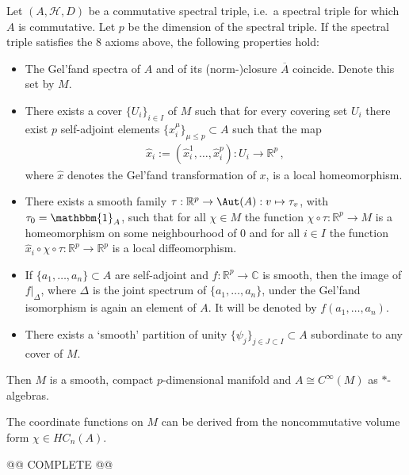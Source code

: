     \begin{construct}
        Let $(A,\mathcal{H},D)$ be a commutative spectral triple, i.e.~a spectral triple for which $A$ is commutative. Let $p$ be the dimension of the spectral triple. If the spectral triple satisfies the 8 axioms above, the following properties hold:
        \begin{itemize}
            \item The Gel'fand spectra of $A$ and of its (norm-)closure $\overline{A}$ coincide. Denote this set by $M$.
            \item There exists a cover $\{U_i\}_{i\in I}$ of $M$ such that for every covering set $U_i$ there exist $p$ self-adjoint elements $\{x^\mu_i\}_{\mu\leq p}\subset A$ such that the map
            \begin{gather}
                \widehat{x}_i:=(\widehat{x}^1_i,\ldots,\widehat{x}^p_i):U_i\rightarrow\mathbb{R}^p\,,
            \end{gather}
            where $\widehat{x}$ denotes the Gel'fand transformation of $x$, is a local homeomorphism.
            \item There exists a smooth family $\tau:\mathbb{R}^p\rightarrow\Aut(A):v\mapsto\tau_v$, with $\tau_0=\mathbbm{1}_A$, such that for all $\chi\in M$ the function $\chi\circ\tau:\mathbb{R}^p\rightarrow M$ is a homeomorphism on some neighbourhood of 0 and for all $i\in I$ the function $\widehat{x}_i\circ\chi\circ\tau:\mathbb{R}^p\rightarrow\mathbb{R}^p$ is a local diffeomorphism.
            \item If $\{a_1,\ldots,a_n\}\subset A$ are self-adjoint and $f:\mathbb{R}^p\rightarrow\mathbb{C}$ is smooth, then the image of $f|_\Delta$, where $\Delta$ is the joint spectrum of $\{a_1,\ldots,a_n\}$, under the Gel'fand isomorphism is again an element of $A$. It will be denoted by $f(a_1,\ldots,a_n)$.
            \item There exists a `smooth' partition of unity $\{\psi_j\}_{j\in J\subset I}\subset A$ subordinate to any cover of $M$.
        \end{itemize}
        Then $M$ is a smooth, compact $p$-dimensional manifold and $A\cong C^\infty(M)$ as $\ast$-algebras.

        The coordinate functions on $M$ can be derived from the noncommutative volume form $\chi\in HC_n(A)$.

        @@ COMPLETE @@
    \end{construct}

